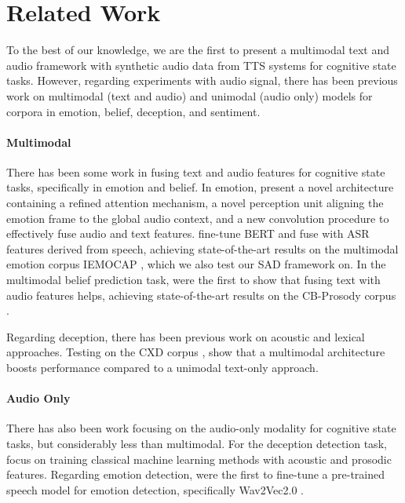 \section{Related Work}
\label{sec:prev}
To the best of our knowledge, we are the first to present a multimodal text and audio framework with synthetic audio data from TTS systems for cognitive state tasks.
However, regarding experiments with audio signal, there has been previous work on multimodal (text and audio) and unimodal (audio only) models for corpora in emotion, belief, deception, and sentiment. 

\paragraph{Multimodal} There has been some work in fusing text and audio features for cognitive state tasks, specifically in emotion and belief. In emotion, 
\citet{zhao24g_interspeech} present a novel architecture containing a refined attention mechanism, a novel perception unit aligning the emotion frame to the global audio context, and a new convolution procedure to effectively fuse audio and text features.
\citet{kyung24_interspeech} fine-tune BERT \citep{devlin-etal-2019-bert} and fuse with ASR features derived from speech, achieving state-of-the-art results on the multimodal emotion corpus IEMOCAP \citep{busso2008iemocap}, which we also test our SAD framework on.
In the multimodal belief prediction task, \citet{murzaku24_interspeech} were the first to show that fusing text with audio features helps, achieving state-of-the-art results on the CB-Prosody corpus \citep{mahler2020prosody}. 

Regarding deception, there has been previous work on acoustic and lexical approaches.  Testing on the CXD corpus \citep{levitan2015cross}, \citet{Mendels2017HybridAD} show that a multimodal architecture boosts performance compared to a unimodal text-only approach.

\paragraph{Audio Only} There has also been work focusing on the audio-only modality for cognitive state tasks, but considerably less than multimodal. For the deception detection task, \cite{levitan18_interspeech,chen2020acoustic,levitan2022believe} focus on training classical machine learning methods with acoustic and prosodic features. Regarding emotion detection, \citet{pepino2021emotion} were the first to fine-tune a pre-trained speech model for emotion detection, specifically Wav2Vec2.0 \citep{baevski2020wav2vec}.